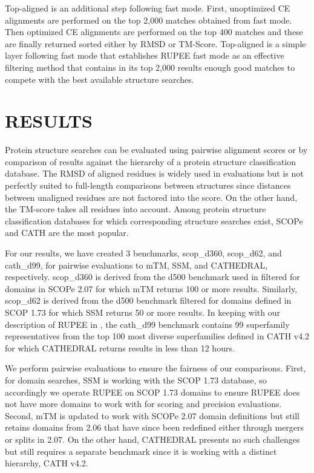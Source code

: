 \documentclass[letter,center,fleqn]{NAR}
\begin{document}
Top-aligned is an additional step following fast mode. 
First, unoptimized CE alignments are performed on the top 2,000 matches obtained from fast mode. 
Then optimized CE alignments are performed on the top 400 matches and these are finally returned sorted either by RMSD or TM-Score. 
Top-aligned is a simple layer following fast mode that establishes RUPEE fast mode as an effective filtering method that contains in its top 2,000 results enough good matches to compete with the best available structure searches. 

\section{RESULTS}

Protein structure searches can be evaluated using pairwise alignment scores or by comparison of results against the hierarchy of a protein structure classification database.
The RMSD of aligned residues is widely used in evaluations but is not perfectly suited to full-length comparisons between structures since distances between unaligned residues are not factored into the score.
On the other hand, the TM-score \cite{Zhang2004} takes all residues into account. 
Among protein structure classification databases for which corresponding structure searches exist, SCOPe \citep{Fox2013} and CATH \citep{Orengo1997} are the most popular. 

For our results, we have created 3 benchmarks, scop\_d360, scop\_d62, and cath\_d99, for pairwise evaluations to mTM, SSM, and CATHEDRAL, respectively.
scop\_d360 is derived from the d500 benchmark used in \cite{Dong2018} filtered for domains in SCOPe 2.07 for which mTM returns 100 or more results.
Similarly, scop\_d62 is derived from the d500 benchmark filtered for domains defined in SCOP 1.73 for which SSM returns 50 or more results.  
In keeping with our description of RUPEE in \cite{Ayoub2017}, the cath\_d99 benchmark contains 99 superfamily representatives from the top 100 most diverse superfamilies defined in CATH v4.2 for which CATHEDRAL returns results in less than 12 hours. 

We perform pairwise evaluations to ensure the fairness of our comparisons. 
First, for domain searches, SSM is working with the SCOP 1.73 database, so accordingly we operate RUPEE on SCOP 1.73 domains to ensure RUPEE does not have more domains to work with for scoring and precision evaluations. 
Second, mTM is updated to work with SCOPe 2.07 domain definitions but still retains domains from 2.06 that have since been redefined either through mergers or splits in 2.07. 
On the other hand, CATHEDRAL presents no such challenges but still requires a separate benchmark since it is working with a distinct hierarchy, CATH v4.2. 
\end{document}
